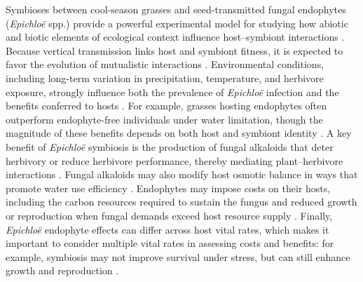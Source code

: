 \documentclass[12pt]{article}\usepackage[]{graphicx}\usepackage[dvipsnames]{xcolor}
\newcommand{\tom}[2]{{\color{red}{#1}}\footnote{\textit{\color{red}{#2}}}}
\begin{document}
Symbioses between cool-season grasses and seed-transmitted fungal endophytes (\textit{Epichloë} spp.) provide a powerful experimental model for studying how abiotic and biotic elements of ecological context influence host–symbiont interactions \citep{schardl2004symbioses,saikkonen2010defensive,oberhofer2014effects,clay2005herbivores}. 
Because vertical transmission links host and symbiont fitness, it is expected to favor the evolution of mutualistic interactions \citep{gundel2024temporal,gundel2011incorporating}. 
Environmental conditions, including long-term variation in precipitation, temperature, and herbivore exposure, strongly influence both the prevalence of \textit{Epichloë} infection and the benefits conferred to hosts \citep{clay2005herbivores,rudgers2016long,fowler2025increasing}. 
For example, grasses hosting endophytes often outperform endophyte-free individuals under water limitation, though the magnitude of these benefits depends on both host and symbiont identity \citep{decunta2021systematic}. 
A key benefit of \textit{Epichloë} symbiosis is the production of fungal alkaloids that deter herbivory or reduce herbivore performance, thereby mediating plant–herbivore interactions \citep{saikkonen2010defensive,crawford2010fungal}.
Fungal alkaloids may also modify host osmotic balance in ways that promote water use efficiency \citep{decunta2021systematic}. 
Endophytes may impose costs on their hosts, including the carbon resources required to sustain the fungus and reduced growth or reproduction when 
fungal demands exceed host resource supply \citep{bennett2022costs}.
Finally, \textit{Epichloë} endophyte effects can differ across host vital rates, which makes it important to consider multiple vital rates in assessing costs and benefits: for example, symbiosis may not improve survival under stress, but can still enhance growth and reproduction \citep{yule2013costs,rudgers2012there}. 
\end{document}
